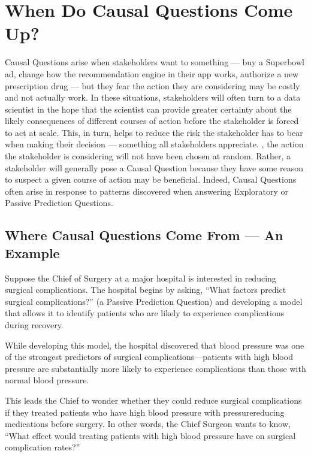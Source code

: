 \documentclass[letterpaper,10pt,english]{jupyterBook}
\begin{document}
\section{When Do Causal Questions Come Up?}
\label{\detokenize{30_questions/35_using_causal_questions:when-do-causal-questions-come-up}}
\sphinxAtStartPar
Causal Questions arise when stakeholders want to  something — buy a Superbowl ad, change how the recommendation engine in their app works, authorize a new prescription drug — but they fear the action they are considering may be costly and not actually work. In these situations, stakeholders will often turn to a data scientist in the hope that the scientist can provide greater certainty about the likely consequences of different courses of action before the stakeholder is forced to act at scale. This, in turn, helps to reduce the risk the stakeholder has to bear when making their decision — something all stakeholders appreciate.
, the action the stakeholder is considering will not have been chosen at random. Rather, a stakeholder will generally pose a Causal Question because they have some reason to suspect a given course of action may be beneficial. Indeed, Causal Questions often arise in response to patterns discovered when answering Exploratory or Passive Prediction Questions.


\subsection{Where Causal Questions Come From — An Example}
\label{\detokenize{30_questions/35_using_causal_questions:where-causal-questions-come-from-an-example}}
\sphinxAtStartPar
Suppose the Chief of Surgery at a major hospital is interested in reducing surgical complications. The hospital begins by asking, “What factors predict surgical complications?” (a Passive Prediction Question) and developing a model that allows it to identify patients who are likely to experience complications during recovery.

\sphinxAtStartPar
While developing this model, the hospital discovered that blood pressure was one of the strongest predictors of surgical complications—patients with high blood pressure are substantially more likely to experience complications than those with normal blood pressure.

\sphinxAtStartPar
This leads the Chief to wonder whether they could reduce surgical complications if they treated patients who have high blood pressure with pressure\sphinxhyphen{}reducing medications before surgery. In other words, the Chief Surgeon wants to know, “What effect would treating patients with high blood pressure have on surgical complication rates?”
\end{document}
